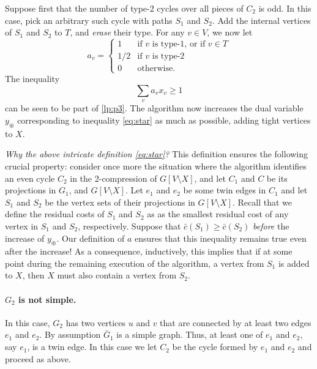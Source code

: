 \documentclass{article}
\newcommand{\0}{\mathbb{0}}
\newcommand{\1}{\mathbb{1}}
\begin{document}
Suppose first that the number of type-2 cycles over all pieces of $C_2$ is odd. In this
case, pick an arbitrary such cycle with paths $S_1$ and $S_2$. Add the internal vertices
of $S_1$ and $S_2$ to $T$, and {\em erase} their type. For any $v \in V$, we now let
\[
  a_v = \begin{cases} 
    1 & \mbox{if $v$ is type-1, or if } v \in T\\
    1/2 & \mbox{if $v$ is type-2}\\
    0 & \mbox{otherwise.}  
    \end{cases}
\]
The inequality
\begin{equation}\tag{$\circledast$}\label{eq:star} 
  \sum_v a_v x_v \geq 1 
\end{equation}
can be seen to be part of \eqref{lp:p3}.
The algorithm now increases the dual variable $y_{\circledast}$ corresponding to
inequality \eqref{eq:star} as much as possible, adding tight vertices to $X$.  

{\em Why the above intricate definition \eqref{eq:star}?} 
This definition ensures the following crucial property: consider once more the situation
where the
algorithm identifies an even cycle $C_2$ in the 2-compression of $G[V\setminus X]$, 
and let $C_1$ and $C$ be its projections in $G_1$, and $G[V\setminus X]$. 
Let $e_1$ and $e_2$ be some twin edges in $C_1$ and let $S_1$ and $S_2$ be the vertex sets
of their projections in $G[V\setminus X]$.
Recall that we define the residual costs of $S_1$ and $S_2$ as 
as the smallest residual cost of any vertex in $S_1$ and $S_2$, respectively. 
Suppose that $\bar{c}(S_1) \geq \bar{c}(S_2)$ {\em before} the increase of $y_
{\circledast}$. 
Our definition of $a$ ensures that this inequality remains true even after the increase!
As a consequence, inductively, this implies that if at some point during the
remaining execution of the algorithm, a vertex from $S_1$
is added to $X$, then $X$ must also contain a vertex from $S_2$. 

\paragraph{$G_2$ is not simple.}

In this case, $G_2$ has two vertices $u$ and $v$ that are connected by at least two edges
$e_1$ and $e_2$. By assumption $\bar{G}_1$ is a simple graph. Thus, at least one of $e_1$
and $e_2$, say $e_1$, is a twin edge. In this case we let $C_2$ be the cycle formed by
$e_1$ and $e_2$ and proceed as above.
\end{document}
